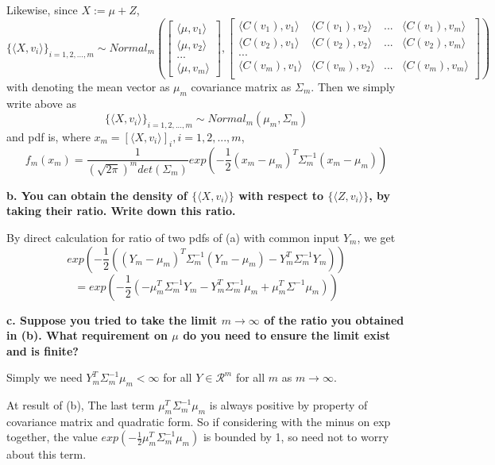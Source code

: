 \documentclass{article}
\begin{document}
Likewise, since $X:=\mu+Z$,
\[\{\langle X, v_i\rangle\}_{i=1,2,...,m} \sim Normal_m(
\begin{bmatrix}
    \langle \mu,v_1 \rangle \\
    \langle \mu,v_2 \rangle \\
    ... \\
    \langle \mu,v_m \rangle
\end{bmatrix}
,
\begin{bmatrix}
    \langle C(v_1),v_1 \rangle & \langle C(v_1),v_2 \rangle & ... & \langle C(v_1),v_m \rangle \\
    \langle C(v_2),v_1 \rangle & \langle C(v_2),v_2 \rangle & ... & \langle C(v_2),v_m \rangle \\
    ... \\
    \langle C(v_m),v_1 \rangle & \langle C(v_m),v_2 \rangle & ... & \langle C(v_m),v_m \rangle \\
\end{bmatrix}
)\]
with denoting the mean vector as $\mu_m$ covariance matrix as $\Sigma_m$. Then we simply write above as
\[\{\langle X, v_i\rangle\}_{i=1,2,...,m} \sim Normal_m(\mu_m,\Sigma_m)\]
and pdf is, where \(x_m=[\langle X, v_i\rangle]_i, i=1,2,...,m\),
\[
    f_m(x_m) = \frac{1}{(\sqrt{2\pi})^m det(\Sigma_m)}exp{(-\frac{1}{2}(x_m-\mu_m)^T\Sigma_m^{-1}(x_m-\mu_m))}
\]


\textbf{
b. You can obtain the density of $\{\langle X, v_i\rangle\}$ with respect to $\{\langle Z,v_i \rangle\}$,
by taking their ratio. Write down this ratio.
}

By direct calculation for ratio of two pdfs of (a) with common input $Y_m$, we get
\[exp(-\frac{1}{2}((Y_m-\mu_m)^T\Sigma_m^{-1}(Y_m-\mu_m)-Y_m^T\Sigma_m^{-1}Y_m))\]
\[=exp(-\frac{1}{2}(-\mu_m^T\Sigma_m^{-1}Y_m-Y_m^T\Sigma_m^{-1}\mu_m+\mu_m^T\Sigma^{-1}\mu_m))\]

\textbf{
c. Suppose you tried to take the limit $m \rightarrow \infty$ of the ratio you obtained in (b).
What requirement on $\mu$ do you need to ensure the limit exist and is finite?
}

Simply we need $Y_m^T\Sigma_m^{-1}\mu_m < \infty$ for all $Y\in \mathcal{R}^m$ for all $m$ as $m\rightarrow\infty$.

At result of (b), The last term $\mu_m^T\Sigma_m^{-1}\mu_m$ is always positive by property of covariance matrix and quadratic form.
So if considering with the minus on exp together,
the value $exp(-\frac{1}{2}\mu_m^T\Sigma_m^{-1}\mu_m)$ is bounded by 1, so need not to worry about this term.
\end{document}

